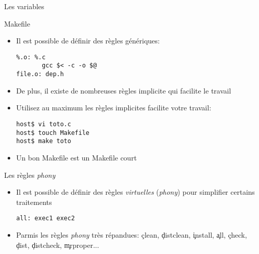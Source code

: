 \begin{frame}[fragile=singleslide]{Les variables}
\end{frame}

\begin{frame}[fragile=singleslide]{Makefile}
  \begin{itemize} 
  \item  Il  est  possible  de définir  des  règles
    génériques:
    \begin{lstlisting} 
%.o: %.c
       gcc $< -c -o $@
file.o: dep.h
    \end{lstlisting} 
  \item De plus, il existe de nombreuses règles implicite qui facilite
    le travail
  \item  Utilisez  au maximum  les  règles  implicites facilite  votre
    travail:
    \begin{lstlisting}
host$ vi toto.c
host$ touch Makefile
host$ make toto
    \end{lstlisting} %
    \item Un bon Makefile est un Makefile court
  \end{itemize}
\end{frame}

\begin{frame}[fragile=singleslide]{Les règles \emph{phony}}
  \begin{itemize} 
  \item  Il  est  possible  de définir  des  règles  \emph{virtuelles}
    (\emph{phony}) pour simplifier certains traitements
    \begin{lstlisting}
all: exec1 exec2
    \end{lstlisting} 
  \item  Parmis  les règles  \emph{phony}  très répandues:  \c{clean},
    \c{distclean},   \c{install},    \c{all},   \c{check},   \c{dist},
    \c{distcheck}, \c{mrproper}...
  \end{itemize} 
\end{frame}
